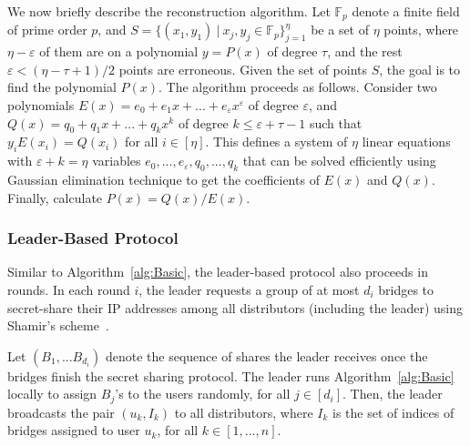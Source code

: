 \documentclass[a4paper,UKenglish]{lipics-v2016}
\newcommand{\fullpaper}[1]{#1}
\newcommand{\fullpaper}[1]{}
\begin{document}
\fullpaper{We now briefly describe the reconstruction algorithm. Let $\mathbb{F}_{p}$ denote a finite field of prime order $p$, and $S=\{(x_{1},y_{1})\:|\:x_{j},y_{j}\in\mathbb{F}_{p}\}_{j=1}^{\eta}$ be a set of $\eta$ points, where $\eta-\varepsilon$ of them are on a polynomial $y=P(x)$ of degree $\tau$, and the rest $\varepsilon<(\eta-\tau+1)/2$ points are erroneous. Given the set of points $S$, the goal is to find the polynomial $P(x)$. The algorithm proceeds as follows. Consider two polynomials $E(x)=e_{0}+e_{1}x+...+e_{\varepsilon}x^{\varepsilon}$ of degree $\varepsilon$, and $Q(x)=q_{0}+q_{1}x+...+q_{k}x^{k}$ of degree $k\leq\varepsilon+\tau-1$ such that $y_{i}E(x_{i})=Q(x_{i})$ for all $i\in[\eta]$. This defines a system of $\eta$ linear equations with $\varepsilon+k=\eta$ variables $e_{0},...,e_{\varepsilon},q_{0},...,q_{k}$ that can be solved efficiently using Gaussian elimination technique to get the coefficients of $E(x)$ and $Q(x)$. Finally, calculate $P(x)=Q(x)/E(x)$.}

\subsubsection{Leader-Based Protocol} \label{sec:leader-alg}

Similar to Algorithm~\ref{alg:Basic}, the leader-based protocol also proceeds in rounds. In each round $i$, the leader requests a group of at most $d_i$ bridges to secret-share their IP addresses among all distributors (including the leader) using Shamir's scheme~\cite{shamir:how}. 

Let $(B_1,...B_{d_i})$ denote the sequence of shares the leader receives once the bridges finish the secret sharing protocol. The leader runs Algorithm~\ref{alg:Basic} locally to assign $B_j$'s to the users randomly, for all ${j \in [d_i]}$. Then, the leader broadcasts the pair $(u_k, I_k)$ to all distributors, where $I_k$ is the set of indices of bridges assigned to user $u_k$, for all $k \in [1,...,n]$.
\end{document}
